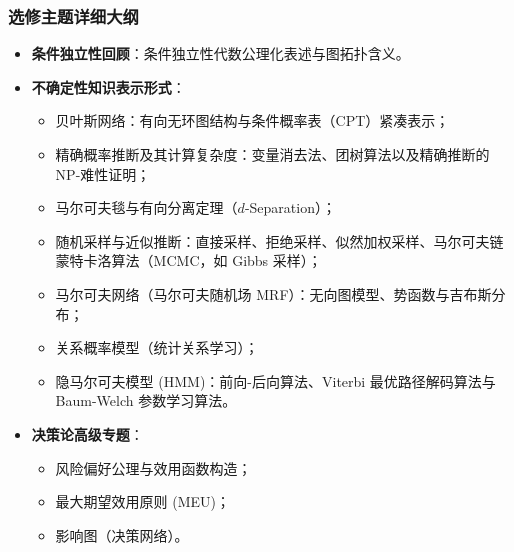 \subsubsection{选修主题详细大纲}
\begin{itemize}
    \item \textbf{条件独立性回顾}：条件独立性代数公理化表述与图拓扑含义。
    \item \textbf{不确定性知识表示形式}：
    \begin{itemize}
        \item 贝叶斯网络：有向无环图结构与条件概率表（CPT）紧凑表示；
        \item 精确概率推断及其计算复杂度：变量消去法、团树算法以及精确推断的 NP-难性证明；
        \item 马尔可夫毯与有向分离定理（$d$-Separation）；
        \item 随机采样与近似推断：直接采样、拒绝采样、似然加权采样、马尔可夫链蒙特卡洛算法（MCMC，如 Gibbs 采样）；
        \item 马尔可夫网络（马尔可夫随机场 MRF）：无向图模型、势函数与吉布斯分布；
        \item 关系概率模型（统计关系学习）；
        \item 隐马尔可夫模型 (HMM)：前向-后向算法、Viterbi 最优路径解码算法与 Baum-Welch 参数学习算法。
    \end{itemize}
    \item \textbf{决策论高级专题}：
    \begin{itemize}
        \item 风险偏好公理与效用函数构造；
        \item 最大期望效用原则 (MEU)；
        \item 影响图（决策网络）。
    \end{itemize}
\end{itemize}

